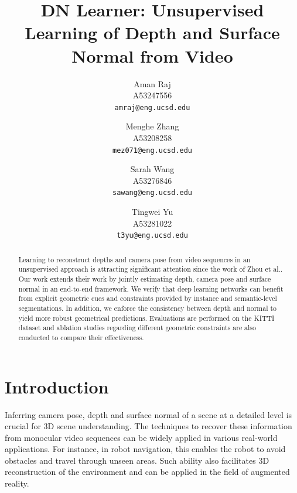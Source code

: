 \documentclass[10pt,twocolumn,letterpaper]{article}
\begin{document}
\title{DN Learner: Unsupervised Learning of Depth and Surface Normal from Video}

\author{Aman Raj\\
A53247556\\
{\tt\small amraj@eng.ucsd.edu}
\and
Menghe Zhang\\
A53208258\\
{\tt\small mez071@eng.ucsd.edu}
\and
Sarah Wang\\
A53276846\\
{\tt\small sawang@eng.ucsd.edu}
\and
Tingwei Yu\\
A53281022\\
{\tt\small t3yu@eng.ucsd.edu}}

\maketitle

\begin{abstract}

Learning to reconstruct depths and camera pose from video sequences in an unsupervised approach is attracting significant attention since the work of Zhou et al.\cite{zhou2017unsupervised}. 
Our work extends their work by jointly estimating depth, camera pose and surface normal in an end-to-end framework. We verify that deep learning networks can benefit from explicit geometric cues and constraints provided by instance and semantic-level segmentations. In addition, we enforce the consistency between depth and normal to yield more robust geometrical predictions. Evaluations are performed on the KITTI dataset\cite{kitti} and ablation studies regarding different geometric constraints are also conducted to compare their effectiveness.  

\end{abstract}


\section{Introduction}
Inferring camera pose, depth and surface normal of a scene at a detailed level is crucial for 3D scene understanding. The techniques to recover these information from monocular video sequences can be widely applied in various real-world applications. For instance, in robot navigation, this enables the robot to avoid obstacles and travel through unseen areas. Such ability also facilitates 3D reconstruction of the environment and can be applied in the field of augmented reality. 
\end{document}
